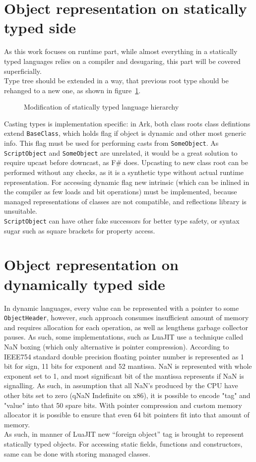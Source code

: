 \documentclass[times, %
			   specification,annotation, %
			   titlepage-extra-ru,specification-extra-ru,annotation-extra-ru, %
			   languages={russian,english} %
			  ]{itmo-student-thesis}
\begin{document}
\section{Object representation on statically typed side}
As this work focuses on runtime part, while almost everything in a statically typed languages relies on a compiler and desugaring, this part will be covered superficially.\\
Type tree should be extended in a way, that previous root type should be rehanged to a new one, as shown in figure~\ref{fig:statically-typed-tree}.
\begin{figure}[!h]
	\caption{Modification of statically typed language hierarchy}\label{fig:statically-typed-tree}
	\centering
	
\end{figure}
Casting types is implementation specific: in Ark, both class roots class defintions extend \texttt{BaseClass}, which holds flag if object is dynamic and other most generic info. This flag must be used for performing casts from \texttt{SomeObject}. As \texttt{ScriptObject} and \texttt{SomeObject} are unrelated, it would be a great solution to require upcast before downcast, as F\# does. Upcasting to new class root can be performed without any checks, as it is a synthetic type without actual runtime representation. For accessing dynamic flag new intrinsic (which can be inlined in the compiler as few loads and bit operations) must be implemented, because managed representations of classes are not compatible, and reflections library is unsuitable.\\
\texttt{ScriptObject} can have other fake successors for better type safety, or syntax sugar such as square brackets for property access.\\

\section{Object representation on dynamically typed side}
In dynamic languages, every value can be represented with a pointer to some \texttt{ObjectHeader}, however, such approach consumes insufficient amount of memory and requires allocation for each operation, as well as lengthens garbage collector pauses. As such, some implementations, such as LuaJIT use a technique called NaN boxing (which only alternative is pointer compression). According to IEEE754 standard double precision floating pointer number is represented as 1 bit for sign, 11 bits for exponent and 52 mantissa. NaN is represented with whole exponent set to 1, and most significant bit of the mantissa represents if NaN is signalling. As such, in assumption that all NaN's produced by the CPU have other bits set to zero (qNaN Indefinite on x86), it is possible to encode "tag" and "value" into that 50 spare bits. With pointer compression and custom memory allocator it is possible to ensure that even 64 bit pointers fit into that amount of memory.\\
As such, in manner of LuaJIT new ``foreign object'' tag is brought to represent statically typed objects. For accessing static fields, functions and constructors, same can be done with storing managed classes.
\end{document}
